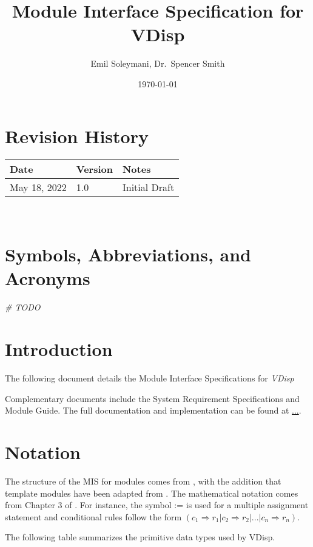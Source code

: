 \documentclass[12pt, titlepage]{article}
\begin{document}
\title{Module Interface Specification for VDisp}
\author{Emil Soleymani, Dr.~Spencer Smith}
\date{\today}
\maketitle

\section{Revision History}

\begin{tabularx}{\textwidth}{p{3cm}p{2cm}X}
\toprule {\bf Date} & {\bf Version} & {\bf Notes}\\
\midrule
May 18, 2022 & 1.0 & Initial Draft\\
\bottomrule
\end{tabularx}

~\newpage

\section{Symbols, Abbreviations, and Acronyms}
\emph{\# TODO}
\newpage

\tableofcontents

\newpage


\section{Introduction}

The following document details the Module Interface Specifications for \emph{VDisp}

Complementary documents include the System Requirement Specifications
and Module Guide.  The full documentation and implementation can be
found at \url{...}.  

\section{Notation}


The structure of the MIS for modules comes from ,
with the addition that template modules have been adapted from
.  The mathematical notation comes from Chapter 3 of
.  For instance, the symbol := is used for a
multiple assignment statement and conditional rules follow the form $(c_1
\Rightarrow r_1 | c_2 \Rightarrow r_2 | ... | c_n \Rightarrow r_n )$.

The following table summarizes the primitive data types used by VDisp. 
\end{document}
